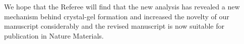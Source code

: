 \documentclass[11pt,a4paper]{article}
\begin{document}
\vskip 5mm

We hope that the Referee will find that the new analysis has revealed a new mechanism behind 
crystal-gel formation and increased the novelty of our manuscript considerably and 
the revised manuscript is now suitable for publication in Nature Materials.  

\clearpage



\end{document}
